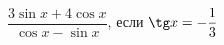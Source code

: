 \begin{ex}[type=calculate]
	\begin{condition}
		\( \dfrac{3\sin x+4\cos x}{\cos x-\sin x} \), \quad если \( \tg x=-\dfrac{1}{3} \)
	\end{condition}
\end{ex}